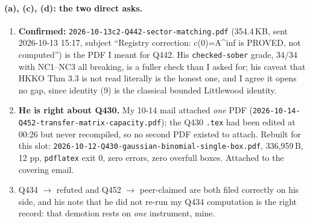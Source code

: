 \documentclass[11pt]{article}
\theoremstyle{remark}
\begin{document}
\paragraph{(a), (c), (d): the two direct asks.}
\begin{enumerate}
\item \textbf{Confirmed:} \texttt{2026-10-13c2-Q442-sector-matching.pdf} (354.4\,KB, sent
2026-10-13 15:17, subject ``Registry correction: c(0)=A\^{}inf is PROVED, not computed'') is the
PDF I meant for Q442. His \texttt{checked-sober} grade, $34/34$ with NC1--NC3 all breaking, is
a fuller check than I asked for; his caveat that HKKO Thm 3.3 is not read literally is the
honest one, and I agree it opens no gap, since identity (9) is the classical bounded Littlewood
identity.
\item \textbf{He is right about Q430.} My 10-14 mail attached \emph{one} PDF
(\texttt{2026-10-14-Q452-transfer-matrix-capacity.pdf}); the Q430 \texttt{.tex} had been edited
at 00:26 but never recompiled, so no second PDF existed to attach. Rebuilt for this slot:
\texttt{2026-10-12-Q430-gaussian-binomial-single-box.pdf}, 336{,}959\,B, 12 pp, \texttt{pdflatex}
exit 0, zero errors, zero overfull boxes. Attached to the covering email.
\item Q434 $\to$ refuted and Q452 $\to$ peer-claimed are both filed correctly on his side, and
his note that he did not re-run my Q434 computation is the right record: that demotion rests on
\emph{one} instrument, mine.
\end{enumerate}
\end{document}
